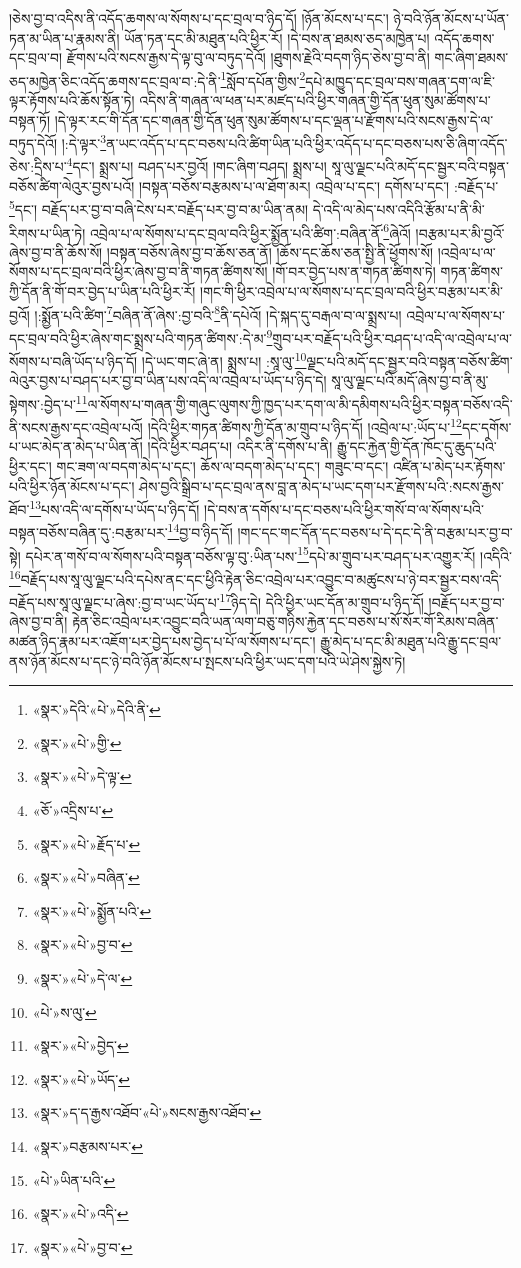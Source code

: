 །ཅེས་བྱ་བ་འདིས་ནི་འདོད་ཆགས་ལ་སོགས་པ་དང་བྲལ་བ་ཉིད་དོ། །ཉོན་མོངས་པ་དང་། ཉེ་བའི་ཉོན་མོངས་པ་ཡོན་ཏན་མ་ཡིན་པ་རྣམས་ནི། ཡོན་ཏན་དང་མི་མཐུན་པའི་ཕྱིར་རོ། །དེ་བས་ན་ཐམས་ཅད་མཁྱེན་པ། འདོད་ཆགས་དང་བྲལ་བ། རྫོགས་པའི་སངས་རྒྱས་དེ་ལྟ་བུ་ལ་བཏུད་དེའོ། །ཐུགས་རྗེའི་བདག་ཉིད་ཅེས་བྱ་བ་ནི། གང་ཞིག་ཐམས་ཅད་མཁྱེན་ཅིང་འདོད་ཆགས་དང་བྲལ་བ་:དེ་ནི་\footnote{«སྣར་»དེའི་«པེ་»དེའི་ནི་}སློབ་དཔོན་གྱིས་\footnote{«སྣར་»«པེ་»གྱི་}དཔེ་མཁྱུད་དང་བྲལ་བས་གཞན་དག་ལ་ཇི་ལྟར་རྟོགས་པའི་ཆོས་སྟོན་ཏེ། འདིས་ནི་གཞན་ལ་ཕན་པར་མཛད་པའི་ཕྱིར་གཞན་གྱི་དོན་ཕུན་སུམ་ཚོགས་པ་བསྟན་ཏོ། །དེ་ལྟར་རང་གི་དོན་དང་གཞན་གྱི་དོན་ཕུན་སུམ་ཚོགས་པ་དང་ལྡན་པ་རྫོགས་པའི་སངས་རྒྱས་དེ་ལ་བཏུད་དེའོ། །:དེ་ལྟར་\footnote{«སྣར་»«པེ་»དེ་ལྟ་}ན་ཡང་འདོད་པ་དང་བཅས་པའི་ཚིག་ཡིན་པའི་ཕྱིར་འདོད་པ་དང་བཅས་པས་ཅི་ཞིག་འདོད་ཅེས་:དྲིས་པ་\footnote{«ཅོ་»འདྲིས་པ་}དང་། སྨྲས་པ། བཤད་པར་བྱའོ། །གང་ཞིག་བཤད། སྨྲས་པ། སཱ་ལུ་ལྗང་པའི་མདོ་དང་སྦྱར་བའི་བསྟན་བཅོས་ཚིག་ལེའུར་བྱས་པའོ། །བསྟན་བཅོས་བརྩམས་པ་ལ་ཐོག་མར། འབྲེལ་པ་དང་། དགོས་པ་དང་། :བརྗོད་པ་\footnote{«སྣར་»«པེ་»རྗོད་པ་}དང་། བརྗོད་པར་བྱ་བ་བཞི་ངེས་པར་བརྗོད་པར་བྱ་བ་མ་ཡིན་ནམ། དེ་འདི་ལ་མེད་པས་འདིའི་རྩོམ་པ་ནི་མི་རིགས་པ་ཡིན་ཏེ། འབྲེལ་པ་ལ་སོགས་པ་དང་བྲལ་བའི་ཕྱིར་སྨྱོན་པའི་ཚིག་:བཞིན་ནོ་\footnote{«སྣར་»«པེ་»བཞིན་}ཞེའོ། །བརྩམ་པར་མི་བྱའོ་ཞེས་བྱ་བ་ནི་ཆོས་སོ། །བསྟན་བཅོས་ཞེས་བྱ་བ་ཆོས་ཅན་ནོ། །ཆོས་དང་ཆོས་ཅན་སྤྱི་ནི་ཕྱོགས་སོ། །འབྲེལ་པ་ལ་སོགས་པ་དང་བྲལ་བའི་ཕྱིར་ཞེས་བྱ་བ་ནི་གཏན་ཚིགས་སོ། །གོ་བར་བྱེད་པས་ན་གཏན་ཚིགས་ཏེ། གཏན་ཚིགས་ཀྱི་དོན་ནི་གོ་བར་བྱེད་པ་ཡིན་པའི་ཕྱིར་རོ། །གང་གི་ཕྱིར་འབྲེལ་པ་ལ་སོགས་པ་དང་བྲལ་བའི་ཕྱིར་བརྩམ་པར་མི་བྱའོ། །:སྨྱོན་པའི་ཚིག་\footnote{«སྣར་»«པེ་»སྨྱོན་པའི་}བཞིན་ནོ་ཞེས་:བྱ་བའི་\footnote{«སྣར་»«པེ་»བྱ་བ་}ནི་དཔེའོ། །དེ་སྐད་དུ་བརྒལ་བ་ལ་སྨྲས་པ། འབྲེལ་པ་ལ་སོགས་པ་དང་བྲལ་བའི་ཕྱིར་ཞེས་གང་སྨྲས་པའི་གཏན་ཚིགས་:དེ་མ་\footnote{«སྣར་»«པེ་»དེ་ལ་}གྲུབ་པར་བརྗོད་པའི་ཕྱིར་བཤད་པ་འདི་ལ་འབྲེལ་པ་ལ་སོགས་པ་བཞི་ཡོད་པ་ཉིད་དོ། །དེ་ཡང་གང་ཞེ་ན། སྨྲས་པ། :སཱ་ལུ་\footnote{«པེ་»ས་ལུ་}ལྗང་པའི་མདོ་དང་སྦྱར་བའི་བསྟན་བཅོས་ཚིག་ལེའུར་བྱས་པ་བཤད་པར་བྱ་བ་ཡིན་པས་འདི་ལ་འབྲེལ་པ་ཡོད་པ་ཉིད་དེ། སཱ་ལུ་ལྗང་པའི་མདོ་ཞེས་བྱ་བ་ནི་མུ་སྟེགས་:བྱེད་པ་\footnote{«སྣར་»«པེ་»བྱེད་}ལ་སོགས་པ་གཞན་གྱི་གཞུང་ལུགས་ཀྱི་ཁྱད་པར་དག་ལ་མི་དམིགས་པའི་ཕྱིར་བསྟན་བཅོས་འདི་ནི་སངས་རྒྱས་དང་འབྲེལ་པའོ། །དེའི་ཕྱིར་གཏན་ཚིགས་ཀྱི་དོན་མ་གྲུབ་པ་ཉིད་དོ། །འབྲེལ་པ་:ཡོད་པ་\footnote{«སྣར་»«པེ་»ཡོད་}དང་དགོས་པ་ཡང་མེད་ན་མེད་པ་ཡིན་ནོ། །དེའི་ཕྱིར་བཤད་པ། འདིར་ནི་དགོས་པ་ནི། རྒྱུ་དང་རྐྱེན་གྱི་དོན་ཁོང་དུ་ཆུད་པའི་ཕྱིར་དང་། གང་ཟག་ལ་བདག་མེད་པ་དང་། ཆོས་ལ་བདག་མེད་པ་དང་། གཟུང་བ་དང་། འཛིན་པ་མེད་པར་རྟོགས་པའི་ཕྱིར་ཉོན་མོངས་པ་དང་། ཤེས་བྱའི་སྒྲིབ་པ་དང་བྲལ་ནས་བླ་ན་མེད་པ་ཡང་དག་པར་རྫོགས་པའི་:སངས་རྒྱས་ཐོབ་\footnote{«སྣར་»ད་ད་རྒྱས་འཐོབ་«པེ་»སངས་རྒྱས་འཐོབ་}པས་འདི་ལ་དགོས་པ་ཡོད་པ་ཉིད་དོ། །དེ་བས་ན་དགོས་པ་དང་བཅས་པའི་ཕྱིར་གསོ་བ་ལ་སོགས་པའི་བསྟན་བཅོས་བཞིན་དུ་:བརྩམ་པར་\footnote{«སྣར་»བརྩམས་པར་}བྱ་བ་ཉིད་དོ། །གང་དང་གང་དོན་དང་བཅས་པ་དེ་དང་དེ་ནི་བརྩམ་པར་བྱ་བ་སྟེ། དཔེར་ན་གསོ་བ་ལ་སོགས་པའི་བསྟན་བཅོས་ལྟ་བུ་:ཡིན་པས་\footnote{«པེ་»ཡིན་པའི་}དཔེ་མ་གྲུབ་པར་བཤད་པར་འགྱུར་རོ། །འདིའི་\footnote{«སྣར་»«པེ་»འདི་}བརྗོད་པས་སཱ་ལུ་ལྗང་པའི་དཔེས་ནང་དང་ཕྱིའི་རྟེན་ཅིང་འབྲེལ་པར་འབྱུང་བ་མཚུངས་པ་ཉེ་བར་སྦྱར་བས་འདི་བརྗོད་པས་སཱ་ལུ་ལྗང་པ་ཞེས་:བྱ་བ་ཡང་ཡོད་པ་\footnote{«སྣར་»«པེ་»བྱ་བ་}ཉིད་དེ། དེའི་ཕྱིར་ཡང་དོན་མ་གྲུབ་པ་ཉིད་དོ། །བརྗོད་པར་བྱ་བ་ཞེས་བྱ་བ་ནི། རྟེན་ཅིང་འབྲེལ་པར་འབྱུང་བའི་ཡན་ལག་བཅུ་གཉིས་རྐྱེན་དང་བཅས་པ་སོ་སོར་གོ་རིམས་བཞིན་མཚན་ཉིད་རྣམ་པར་འཇོག་པར་བྱེད་པས་བྱེད་པ་པོ་ལ་སོགས་པ་དང་། རྒྱུ་མེད་པ་དང་མི་མཐུན་པའི་རྒྱུ་དང་བྲལ་ནས་ཉོན་མོངས་པ་དང་ཉེ་བའི་ཉོན་མོངས་པ་སྤངས་པའི་ཕྱིར་ཡང་དག་པའི་ཡེ་ཤེས་སྐྱེས་ཏེ། 